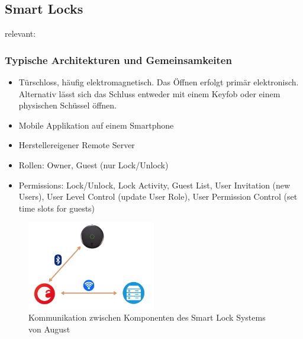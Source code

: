 \subsection{Smart Locks}
\label{sec:sota_smart_locks}

	relevant: \cite{Ye2017}\cite{Fuller2017}\cite{Rose2016}\cite{Ho2016}
	
	\subsubsection{Typische Architekturen und Gemeinsamkeiten}
		\begin{itemize}
			\item Türschloss, häufig elektromagnetisch. Das Öffnen erfolgt primär elektronisch. Alternativ lässt sich das Schluss entweder mit einem Keyfob oder einem physischen Schüssel öffnen.
			\item Mobile Applikation auf einem Smartphone
			\item Herstellereigener Remote Server
		\end{itemize}
		\begin{itemize}
			\item Rollen: Owner, Guest (nur Lock/Unlock)
			\item Permissions: Lock/Unlock, Lock Activity, Guest List, User Invitation (new Users), User Level Control (update User Role), User Permission Control (set time slots for guests)
		\end{itemize}
	
		\begin{figure}[H]
			\centering
			\includegraphics[width=0.5\textwidth]{paperNotes/ye2017_august}
			\caption{Kommunikation zwischen Komponenten des Smart Lock Systems von August}
			\label{fig:august}
		\end{figure}